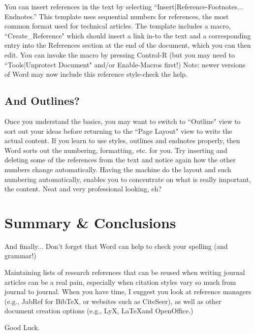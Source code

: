 \documentclass[a4paper, 12pt]{article}
\begin{document}
    You can insert references in the text by selecting “Insert|Reference-Footnotes... Endnotes.” 
    This template uses sequential numbers for references, the most common format used for 
    technical articles. The template includes a macro, ``Create\_Reference" which should insert 
    a link in-to the text and a corresponding entry into the References section at the end of 
    the document, which you can then edit. You can invoke the macro by pressing Control-R 
    (but you may need to ``Tools|Unprotect Document" and/or Enable-Macros first!) 
    Note: newer versions of Word may now include this reference style-check the help.
    
    \subsection{And Outlines?}
    
    Once you understand the basics, you may want to switch to ``Outline" view to sort out your ideas 
    before returning to the ``Page Layout" view to write the actual content. If you learn to use styles, 
    outlines and endnotes properly, then Word sorts out the numbering, formatting, etc. for you. 
    Try inserting and deleting some of the references from the text and notice again how the other 
    numbers change automatically. Having the machine do the layout and such numbering automatically, 
    enables you to concentrate on what is really important, the content. 
    Neat and very professional looking, eh?
    
    
    \section{Summary \& Conclusions}
    
    And finally... Don’t forget that Word can help to check your spelling (and grammar!)
    
    Maintaining lists of research references that can be reused when writing journal articles 
    can be a real pain, especially when citation styles vary so much from journal to journal. 
    When you have time, I suggest you look at reference managers 
    (e.g., JabRef for BibTeX, or websites such as CiteSeer), as well as other document creation 
    options (e.g., LyX, \LaTeX and OpenOffice.)
    
    Good Luck.
    
    
    
    \printbibliography
    
    
        
\end{document}
